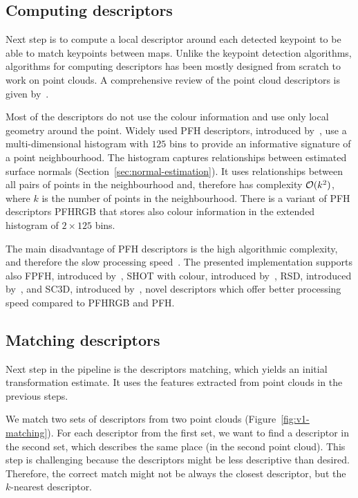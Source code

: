 \subsection{Computing descriptors}
\label{sec:compute-descriptors}

Next step is to compute a local descriptor around each detected keypoint to be able to match keypoints between maps. Unlike the keypoint detection algorithms, algorithms for computing descriptors has been mostly designed from scratch to work on point clouds. A comprehensive review of the point cloud descriptors is given by~\citet{YasirThesis}.

Most of the descriptors do not use the colour information and use only local geometry around the point. Widely used \gls{PFH} descriptors, introduced by~\citet{rusu2008pfh}, use a multi-dimensional histogram with $125$ bins to provide an informative signature of a point neighbourhood. The histogram captures relationships between estimated surface normals (Section~\ref{sec:normal-estimation}). It uses relationships between all pairs of points in the neighbourhood and, therefore has complexity $\operatorname{\mathcal{O}}(k^2)$, where $k$ is the number of points in the neighbourhood. There is a variant of \gls{PFH} descriptors \gls{PFHRGB} that stores also colour information in the extended histogram of $2 \times 125$ bins.

The main disadvantage of \gls{PFH} descriptors is the high algorithmic complexity, and therefore the slow processing speed~\citep{rusu2009fpfh}. The presented implementation supports also \gls{FPFH}, introduced by~\citet{rusu2009fpfh}, \gls{SHOT} with colour, introduced by~\citet{tombari2011shot}, \gls{RSD}, introduced by~\citet{marton2010rsd}, and \gls{SC3D}, introduced by~\citet{frome2004sc3d}, novel descriptors which offer better processing speed compared to \gls{PFHRGB} and \gls{PFH}.

\subsection{Matching descriptors}
\label{sec:matching}

Next step in the pipeline is the descriptors matching, which yields an initial transformation estimate. It uses the features extracted from point clouds in the previous steps.

We match two sets of descriptors from two point clouds (Figure~\ref{fig:v1-matching}). For each descriptor from the first set, we want to find a descriptor in the second set, which describes the same place (in the second point cloud). This step is challenging because the descriptors might be less descriptive than desired. Therefore, the correct match might not be always the closest descriptor, but the $k$-nearest descriptor.

